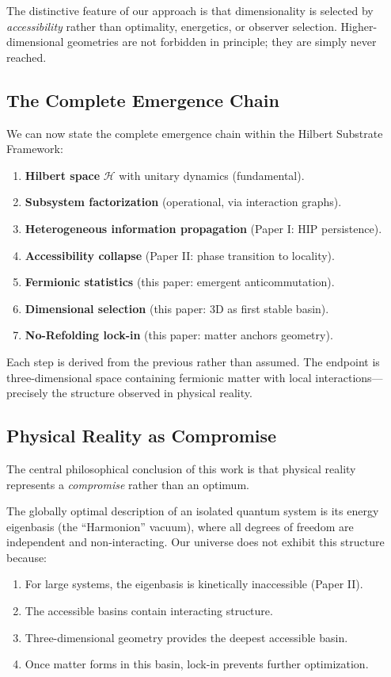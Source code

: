 \documentclass[11pt]{article}
\begin{document}
The distinctive feature of our approach is that dimensionality is selected by \emph{accessibility} rather than optimality, energetics, or observer selection. Higher-dimensional geometries are not forbidden in principle; they are simply never reached.

\subsection{The Complete Emergence Chain}

We can now state the complete emergence chain within the Hilbert Substrate Framework:

\begin{enumerate}
\item \textbf{Hilbert space} $\mathcal{H}$ with unitary dynamics (fundamental).
\item \textbf{Subsystem factorization} (operational, via interaction graphs).
\item \textbf{Heterogeneous information propagation} (Paper I: HIP persistence).
\item \textbf{Accessibility collapse} (Paper II: phase transition to locality).
\item \textbf{Fermionic statistics} (this paper: emergent anticommutation).
\item \textbf{Dimensional selection} (this paper: 3D as first stable basin).
\item \textbf{No-Refolding lock-in} (this paper: matter anchors geometry).
\end{enumerate}

Each step is derived from the previous rather than assumed. The endpoint is three-dimensional space containing fermionic matter with local interactions---precisely the structure observed in physical reality.

\subsection{Physical Reality as Compromise}

The central philosophical conclusion of this work is that physical reality represents a \emph{compromise} rather than an optimum.

The globally optimal description of an isolated quantum system is its energy eigenbasis (the ``Harmonion'' vacuum), where all degrees of freedom are independent and non-interacting. Our universe does not exhibit this structure because:

\begin{enumerate}
\item For large systems, the eigenbasis is kinetically inaccessible (Paper II).
\item The accessible basins contain interacting structure.
\item Three-dimensional geometry provides the deepest accessible basin.
\item Once matter forms in this basin, lock-in prevents further optimization.
\end{enumerate}
\end{document}
